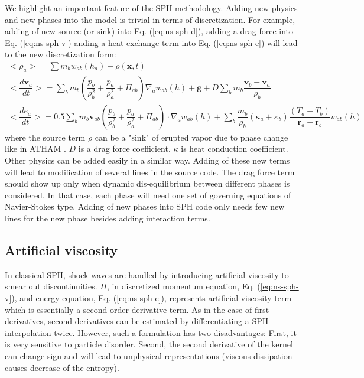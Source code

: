 \documentclass[journal abbreviation, manuscript]{copernicus}
\begin{document}
We highlight an important feature of the SPH methodology. Adding new physics and new phases into the model is trivial in terms of discretization. For example, adding of new source (or sink) into Eq.  (\ref{eq:ns-sph-d}), adding a drag force into Eq. (\ref{eq:ns-sph-v})  anding a heat exchange term into Eq. (\ref{eq:ns-sph-e}) will lead to the new discretization form:
\begin{align}
<\rho_a> = \sum m_b w_{ab} (h_a) + \dot{\rho}(\textbf{x},t)\label{eq:ns-source-sph-d} \\
<\dfrac{d \textbf{v}_a}{d t}>= \sum_b m_b (\dfrac{p_b}{\rho_b^2} + \dfrac{p_a}{\rho_a^2} + \Pi_{ab}) \nabla_a w_{a b}(h) +\textbf{g} + D \sum	_b m_b \dfrac{\textbf{v}_b - \textbf{v}_a}{\rho_b} \label{eq:ns-drag-sph-v} \\
<\dfrac{d e_a}{d t}>=
 0.5\sum_b m_b \textbf{v}_{a b}(\dfrac{p_b}{\rho_b^2} + \dfrac{p_a}{\rho_a^2} + \Pi_{ab}) \cdot \nabla_a w_{a b}(h) + \sum_b \dfrac{m_b}{\rho_b}(\kappa_a + \kappa_b) \dfrac{(T_a - T_b)}{\textbf{r}_a - \textbf{r}_b} w_{ab}(h) \label{eq:ns-conduction-sph-e}
\end{align}
where the source term $\dot{\rho}$ can be a "sink" of erupted vapor due to phase change like in ATHAM \citep{oberhuber1998volcanic}. $D$ is a drag force coefficient. $\kappa$ is heat conduction coefficient. Other physics can be added easily in a similar way. Adding of these new terms will lead to modification of several lines in the source code. The drag force term should show up only when dynamic dis-equilibrium between different phases is considered. In that case, each phase will need one set of governing equations of Navier-Stokes type. Adding of new phases into SPH code only needs few new lines for the new phase besides adding  interaction terms.


\subsection{Artificial viscosity} \label{sec:artificial-viscosity}
In classical SPH, shock waves are handled by introducing artificial viscosity to smear out discontinuities. $\Pi$, in discretized momentum equation, Eq. (\ref{eq:ns-sph-v}), and energy equation, Eq. (\ref{eq:ns-sph-e}), represents artificial viscosity term which is essentially a second order derivative term. As in the case of first derivatives, second derivatives can be estimated by differentiating a SPH interpolation twice. However, such a formulation has two disadvantages: First, it is very sensitive to particle disorder. Second, the second derivative of the kernel can change sign and will lead to unphysical representations (viscous dissipation causes decrease of the entropy). 
\end{document}

